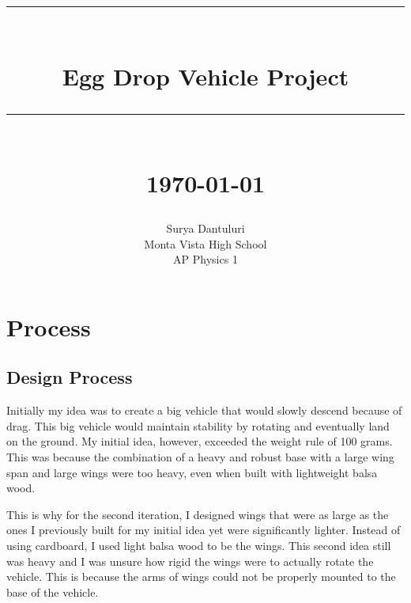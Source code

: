 \documentclass[12pt]{report}
\newcommand{\HRule}[1]{\rule{\linewidth}{#1}}
\begin{document}
\title{ \normalsize \textsc{}
		\\ [2.0cm]
		\HRule{0.5pt} \\
		\LARGE \textbf{{Egg Drop Vehicle Project}}
		\HRule{2pt} \\ [0.5cm]
		\normalsize \today \vspace*{5\baselineskip}}

\date{}

\author{
		Surya Dantuluri \\
		Monta Vista High School \\
		AP Physics 1}

\maketitle
\tableofcontents

\sectionfont{\scshape}


\chapter{Process}
\section{Design Process}
\qquad Initially my idea was to create a big vehicle that would slowly descend because of drag. This big vehicle would maintain stability by rotating and eventually land on the ground. My initial idea, however, exceeded the weight rule of 100 grams. This was because the combination of a heavy and robust base with a large wing span and large wings were too heavy, even when built with lightweight balsa wood. 

This is why for the second iteration, I designed wings that were as large as the ones I previously built for my initial idea yet were significantly lighter. Instead of using cardboard, I used light balsa wood to be the wings. This second idea still was heavy and I was unsure how rigid the wings were to actually rotate the vehicle. This is because the arms of wings could not be properly mounted to the base of the vehicle.
\end{document}

